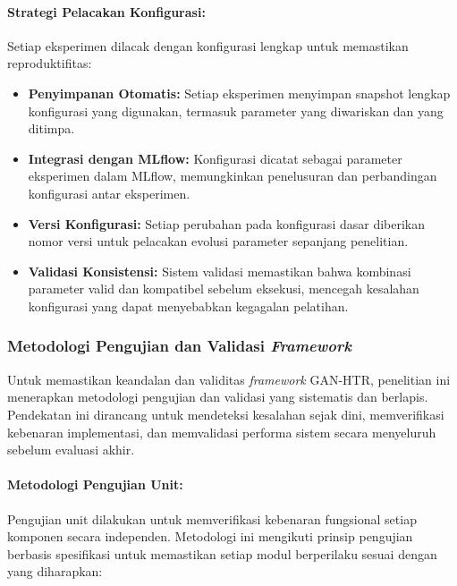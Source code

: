 \documentclass[12pt,a4paper]{article}
\begin{document}
\paragraph{Strategi Pelacakan Konfigurasi:}
Setiap eksperimen dilacak dengan konfigurasi lengkap untuk memastikan reproduktifitas:

\begin{itemize}[leftmargin=*, nosep]
\item \textbf{Penyimpanan Otomatis:} Setiap eksperimen menyimpan snapshot lengkap konfigurasi yang digunakan, termasuk parameter yang diwariskan dan yang ditimpa.

\item \textbf{Integrasi dengan MLflow:} Konfigurasi dicatat sebagai parameter eksperimen dalam MLflow, memungkinkan penelusuran dan perbandingan konfigurasi antar eksperimen.

\item \textbf{Versi Konfigurasi:} Setiap perubahan pada konfigurasi dasar diberikan nomor versi untuk pelacakan evolusi parameter sepanjang penelitian.

\item \textbf{Validasi Konsistensi:} Sistem validasi memastikan bahwa kombinasi parameter valid dan kompatibel sebelum eksekusi, mencegah kesalahan konfigurasi yang dapat menyebabkan kegagalan pelatihan.
\end{itemize}

\subsubsection{Metodologi Pengujian dan Validasi \textit{Framework}}
Untuk memastikan keandalan dan validitas \textit{framework} GAN-HTR, penelitian ini menerapkan metodologi pengujian dan validasi yang sistematis dan berlapis. Pendekatan ini dirancang untuk mendeteksi kesalahan sejak dini, memverifikasi kebenaran implementasi, dan memvalidasi performa sistem secara menyeluruh sebelum evaluasi akhir.

\paragraph{Metodologi Pengujian Unit:}
Pengujian unit dilakukan untuk memverifikasi kebenaran fungsional setiap komponen secara independen. Metodologi ini mengikuti prinsip pengujian berbasis spesifikasi untuk memastikan setiap modul berperilaku sesuai dengan yang diharapkan:
\end{document}
